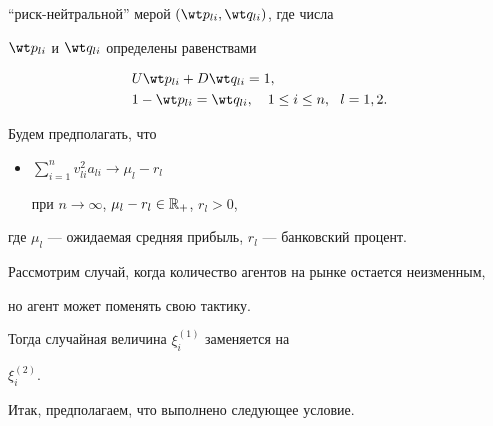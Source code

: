 ``риск-нейтральной'' мерой $(\wt p_{li}, \wt q_{li})$, где числа


$\wt p_{li}$ и $\wt q_{li}$ определены равенствами


\begin{align*}  %


&U\wt p_{li} + D\wt q_{li}=1,\\


&1 - \wt p_{li} =\wt q_{li}, \quad 1\le i\le n,\ \ l=1,2.


\end{align*}





Будем предполагать, что


\begin{itemize}


\item[$(4')$] $\sum\limits_{i=1}^{n} v^2_{li}a_{li}\to\mu_l-r_l$


при $n\to\infty$, $\mu_l-r_l\in\Bbb R_+$, $r_l>0$,


\end{itemize}


где $\mu_l$ --- ожидаемая средняя прибыль, $r_l$ --- банковский процент.





Рассмотрим случай, когда количество агентов на рынке остается неизменным, 


но агент может поменять свою тактику.


Тогда случайная величина $\xi_i^{(1)}$ заменяется на


$\xi_{i}^{(2)}.$


Итак, предполагаем, что выполнено следующее условие.


